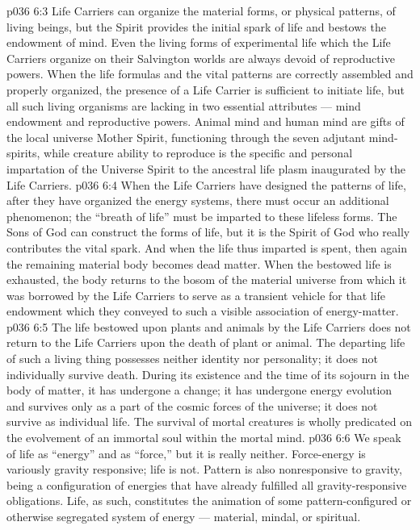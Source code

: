 \vs p036 6:3 Life Carriers can organize the material forms, or physical patterns, of living beings, but the Spirit provides the initial spark of life and bestows the endowment of mind. Even the living forms of experimental life which the Life Carriers organize on their Salvington worlds are always devoid of reproductive powers. When the life formulas and the vital patterns are correctly assembled and properly organized, the presence of a Life Carrier is sufficient to initiate life, but all such living organisms are lacking in two essential attributes --- mind endowment and reproductive powers. Animal mind and human mind are gifts of the local universe Mother Spirit, functioning through the seven adjutant mind\hyp{}spirits, while creature ability to reproduce is the specific and personal impartation of the Universe Spirit to the ancestral life plasm inaugurated by the Life Carriers.
\vs p036 6:4 \pc When the Life Carriers have designed the patterns of life, after they have organized the energy systems, there must occur an additional phenomenon; the “breath of life” must be imparted to these lifeless forms. The Sons of God can construct the forms of life, but it is the Spirit of God who really contributes the vital spark. And when the life thus imparted is spent, then again the remaining material body becomes dead matter. When the bestowed life is exhausted, the body returns to the bosom of the material universe from which it was borrowed by the Life Carriers to serve as a transient vehicle for that life endowment which they conveyed to such a visible association of energy\hyp{}matter.
\vs p036 6:5 The life bestowed upon plants and animals by the Life Carriers does not return to the Life Carriers upon the death of plant or animal. The departing life of such a living thing possesses neither identity nor personality; it does not individually survive death. During its existence and the time of its sojourn in the body of matter, it has undergone a change; it has undergone energy evolution and survives only as a part of the cosmic forces of the universe; it does not survive as individual life. The survival of mortal creatures is wholly predicated on the evolvement of an immortal soul within the mortal mind.
\vs p036 6:6 \pc We speak of life as “energy” and as “force,” but it is really neither. Force\hyp{}energy is variously gravity responsive; life is not. Pattern is also nonresponsive to gravity, being a configuration of energies that have already fulfilled all gravity\hyp{}responsive obligations. Life, as such, constitutes the animation of some pattern\hyp{}configured or otherwise segregated system of energy --- material, mindal, or spiritual.
